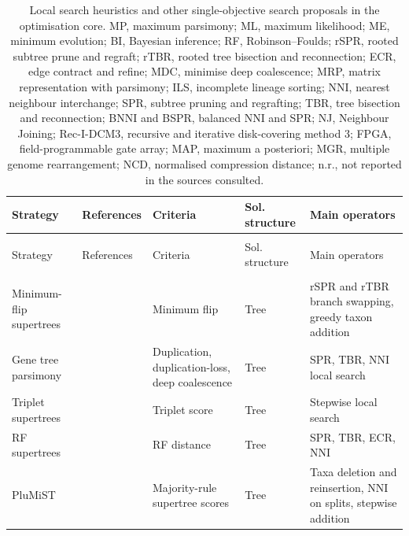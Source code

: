 \begin{landscape}
{\scriptsize
\setlength{\tabcolsep}{4pt}
\setlength{\LTcapwidth}{\linewidth}
\begin{longtable}{>{\raggedright\arraybackslash}p{3.4cm}>{\raggedright\arraybackslash}p{4.0cm}>{\raggedright\arraybackslash}p{3.6cm}>{\raggedright\arraybackslash}p{2.2cm}>{\raggedright\arraybackslash}p{4.5cm}}
\caption{Local search heuristics and other single-objective search proposals in the optimisation core. MP, maximum parsimony; ML, maximum likelihood; ME, minimum evolution; BI, Bayesian inference; RF, Robinson--Foulds; rSPR, rooted subtree prune and regraft; rTBR, rooted tree bisection and reconnection; ECR, edge contract and refine; MDC, minimise deep coalescence; MRP, matrix representation with parsimony; ILS, incomplete lineage sorting; NNI, nearest neighbour interchange; SPR, subtree pruning and regrafting; TBR, tree bisection and reconnection; BNNI and BSPR, balanced NNI and SPR; NJ, Neighbour Joining; Rec-I-DCM3, recursive and iterative disk-covering method 3; FPGA, field-programmable gate array; MAP, maximum a posteriori; MGR, multiple genome rearrangement; NCD, normalised compression distance; n.r., not reported in the sources consulted.}\label{tab:ls}\\
\toprule
Strategy & References & Criteria & Sol. structure & Main operators
\\
\midrule
\endfirsthead
\multicolumn{5}{l}{\emph{Table \ref{tab:ls} (continued)}}\\
\toprule
Strategy & References & Criteria & Sol. structure & Main operators
\\
\midrule
\endhead
\bottomrule
\endfoot
\multicolumn{5}{l}{\textit{Supertrees and species trees}}\\
Minimum-flip supertrees & \cite{R07506} & Minimum flip & Tree & rSPR and rTBR branch swapping, greedy taxon addition\\
Gene tree parsimony & \cite{R00415,R07500,R00421,R04154,R04164,R01456,R05464,R05466,R00480,R04185} & Duplication, duplication-loss, deep coalescence & Tree & SPR, TBR, NNI local search\\
Triplet supertrees & \cite{R05457} & Triplet score & Tree & Stepwise local search\\
RF supertrees & \cite{R05640,R00471,R04183,R05653} & RF distance & Tree & SPR, TBR, ECR, NNI\\
PluMiST & \cite{R05536} & Majority-rule supertree scores & Tree & Taxa deletion and reinsertion, NNI on splits, stepwise addition\\

\end{longtable}}
\end{landscape}

